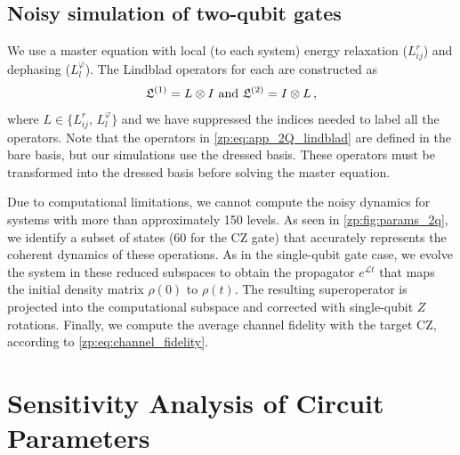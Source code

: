 \subsection{Noisy simulation of two-qubit gates} \label{zp:app:subsec_2Q_noise_details_and_converge}
We use a master equation with local (to each \zps system) energy relaxation ($L^r_{ij}$) and dephasing ($L^\varphi_l$).
The Lindblad operators for each \zps are constructed as
\begin{equation}\label{zp:eq:app_2Q_lindblad}
    \mathfrak{L}^{(1)} = L \otimes I\,\, {\rm and} \,\, \mathfrak{L}^{(2)} = I \otimes L\,,
\end{equation}
where $L \in \{L^r_{ij},\, L^\varphi_l\}$ and we have suppressed the indices needed to label all the operators.
Note that the operators in \cref{zp:eq:app_2Q_lindblad} are defined in the bare basis, but our simulations use the dressed basis.
These operators must be transformed into the dressed basis before solving the master equation.

Due to computational limitations, we cannot compute the noisy dynamics for systems with more than approximately 150 levels.
As seen in \cref{zp:fig:params_2q}, we identify a subset of states (60 for the CZ gate) that accurately represents the coherent dynamics of these operations.
As in the single-qubit gate case, we evolve the system in these reduced subspaces to obtain the propagator $e^{\mathcal{L} t}$  that maps the initial density matrix $\rho(0)$ to $\rho(t)$.
The resulting superoperator is projected into the computational subspace and corrected with single-qubit $Z$ rotations.
Finally, we compute the  average channel fidelity with the target CZ, according to \cref{zp:eq:channel_fidelity}.

 \section{Sensitivity Analysis of Circuit Parameters}\label{zp:app:sensitivity}

